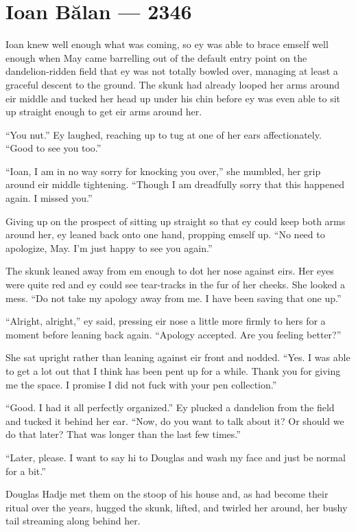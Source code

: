 \hypertarget{ioan-bux103lan-2346}{%
\chapter{Ioan Bălan — 2346}\label{ioan-bux103lan-2346}}

Ioan knew well enough what was coming, so ey was able to brace emself well enough when May came barrelling out of the default entry point on the dandelion-ridden field that ey was not totally bowled over, managing at least a graceful descent to the ground. The skunk had already looped her arms around eir middle and tucked her head up under his chin before ey was even able to sit up straight enough to get eir arms around her.

``You nut.'' Ey laughed, reaching up to tug at one of her ears affectionately. ``Good to see you too.''

``Ioan, I am in no way sorry for knocking you over,'' she mumbled, her grip around eir middle tightening. ``Though I am dreadfully sorry that this happened again. I missed you.''

Giving up on the prospect of sitting up straight so that ey could keep both arms around her, ey leaned back onto one hand, propping emself up. ``No need to apologize, May. I'm just happy to see you again.''

The skunk leaned away from em enough to dot her nose against eirs. Her eyes were quite red and ey could see tear-tracks in the fur of her cheeks. She looked a mess. ``Do not take my apology away from me. I have been saving that one up.''

``Alright, alright,'' ey said, pressing eir nose a little more firmly to hers for a moment before leaning back again. ``Apology accepted. Are you feeling better?''

She sat upright rather than leaning against eir front and nodded. ``Yes. I was able to get a lot out that I think has been pent up for a while. Thank you for giving me the space. I promise I did not fuck with your pen collection.''

``Good. I had it all perfectly organized.'' Ey plucked a dandelion from the field and tucked it behind her ear. ``Now, do you want to talk about it? Or should we do that later? That was longer than the last few times.''

``Later, please. I want to say hi to Douglas and wash my face and just be normal for a bit.''

Douglas Hadje met them on the stoop of his house and, as had become their ritual over the years, hugged the skunk, lifted, and twirled her around, her bushy tail streaming along behind her.

